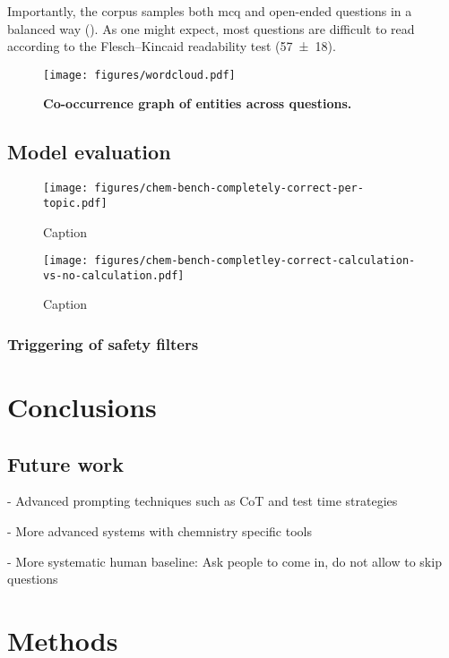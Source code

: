 \documentclass[11pt, oneside]{article}
\begin{document}
Importantly, the corpus samples both \gls{mcq} and open-ended questions in a balanced way (). As one might expect, most questions are difficult to read according to the Flesch–Kincaid readability test (\num{57\pm18}). \cite{kincaid1975derivation}


\begin{figure}
    \centering 
    \texttt{[image: figures/wordcloud.pdf]}
    \caption{\textbf{Co-occurrence graph of entities across questions.}}
    \label{fig:wordcloud}
\end{figure}


\subsection{Model evaluation}


\begin{figure}
    \centering
    \texttt{[image: figures/chem-bench-completely-correct-per-topic.pdf]}
    \caption{Caption}
    \label{fig:enter-label}
\end{figure}


\begin{figure}
    \centering
    \texttt{[image: figures/chem-bench-completley-correct-calculation-vs-no-calculation.pdf]}
    \caption{Caption}
    \label{fig:enter-label}
\end{figure}

\subsubsection{Triggering of safety filters}

\section{Conclusions}

\subsection{Future work}
- Advanced prompting techniques such as CoT and test time strategies 

- More advanced systems with chemnistry specific tools 

- More systematic human baseline: Ask people to come in, do not allow to skip questions

\section{Methods}
\end{document}
